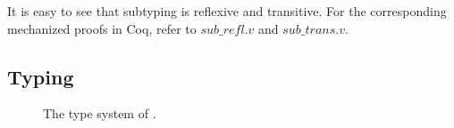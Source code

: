 


It is easy to see that subtyping is reflexive and transitive. For the
corresponding mechanized proofs in Coq, refer to $sub\_refl.v$ and
$sub\_trans.v$.

\subsection{Typing}

\begin{figure*}

\begin{mathpar}



\end{mathpar}
\begin{mathpar}



\end{mathpar}
\caption{The type system of \name.}
  \label{fig:fi-typing}
\end{figure*}

